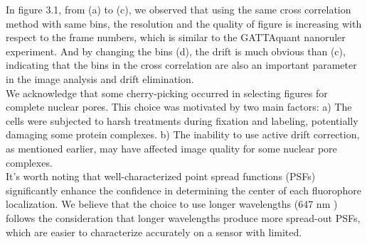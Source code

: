 \documentclass[a4paper,english,12pt,bibliography=totoc]{scrreprt}
\begin{document}
 In figure 3.1, from (a) to (c), we observed that using the same cross correlation method with same bins, the resolution and the quality of figure is increasing with respect to the frame numbers, which is similar to the GATTAquant nanoruler experiment. And by changing the bins (d), the drift is much obvious than (c), indicating that the bins in the cross correlation are also an important parameter in the image analysis and drift elimination.\\

We acknowledge that some cherry-picking occurred in selecting figures for complete nuclear pores. This choice was motivated by two main factors:
a) The cells were subjected to harsh treatments during fixation and labeling, potentially damaging some protein complexes.
b) The inability to use active drift correction, as mentioned earlier, may have affected image quality for some nuclear pore complexes.\\

 It's worth noting that well-characterized point spread functions (PSFs) significantly enhance the confidence in determining the center of each fluorophore localization. We believe that the choice to use longer wavelengths (647 nm ) follows the consideration that longer wavelengths produce more spread-out PSFs, which are easier to characterize accurately on a sensor with limited. 
 
\printbibliography
\end{document}
